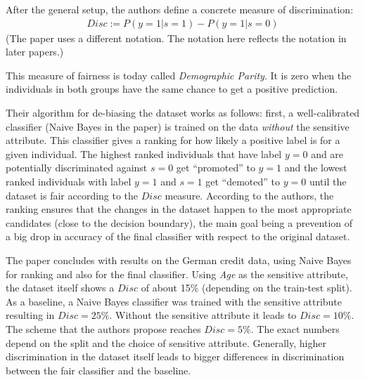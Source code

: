 After the general setup, the authors define a concrete measure of discrimination:
\begin{align}
  \label{eq:disc}
  Disc := P(y=1|s =1) - P(y=1|s = 0)
\end{align}
(The paper uses a different notation.
The notation here reflects the notation in later papers.)

This measure of fairness is today called \emph{Demographic Parity}.
It is zero when the individuals in both groups have the same chance to get a positive prediction.

Their algorithm for de-biasing the dataset works as follows:
first, a well-calibrated classifier (Naive Bayes in the paper) is trained on the data
\emph{without} the sensitive attribute.
This classifier gives a ranking for how likely a positive label is for a given individual.
The highest ranked individuals that have label \(y=0\)
and are potentially discriminated against \(s=0\) get ``promoted'' to \(y=1\)
and the lowest ranked individuals with label \(y=1\) and \(s=1\) get ``demoted'' to \(y=0\)
until the dataset is fair according to the \(Disc\) measure.
According to the authors, the ranking ensures that the changes in the dataset
happen to the most appropriate candidates (close to the decision boundary),
the main goal being a prevention of a big drop in accuracy of the final classifier
with respect to the original dataset.

The paper concludes with results on the German credit data,
using Naive Bayes for ranking and also for the final classifier.
Using \emph{Age} as the sensitive attribute,
the dataset itself shows a \(Disc\) of about 15\% (depending on the train-test split).
As a baseline, a Naive Bayes classifier was trained with the sensitive attribute
resulting in \(Disc = 25\%\).
Without the sensitive attribute it leads to \(Disc = 10\%\).
The scheme that the authors propose reaches \(Disc = 5\%\).
The exact numbers depend on the split and the choice of sensitive attribute.
Generally, higher discrimination in the dataset itself
leads to bigger differences in discrimination between the fair classifier and the baseline.

